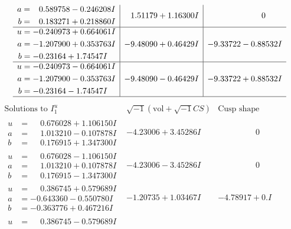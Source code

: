 \documentclass[1p]{elsarticle_modified}
\theoremstyle{definition}
\newcommand{\I}{\sqrt{-1}}
\begin{document}
$$\begin{array}{c|c|c}
\begin{aligned}
a &= \phantom{-}0.589758 - 0.246208 I \\
b &= \phantom{-}0.183271 + 0.218860 I\end{aligned}
 & \phantom{-}1.51179 + 1.16300 I & \phantom{-0.000000 } 0 \\ \hline\begin{aligned}
u &= -0.240973 + 0.664061 I \\
a &= -1.207900 + 0.353763 I \\
b &= -0.23164 + 1.74547 I\end{aligned}
 & -9.48090 + 0.46429 I & -9.33722 - 0.88532 I \\ \hline\begin{aligned}
u &= -0.240973 - 0.664061 I \\
a &= -1.207900 - 0.353763 I \\
b &= -0.23164 - 1.74547 I\end{aligned}
 & -9.48090 - 0.46429 I & -9.33722 + 0.88532 I\\
 \hline 
 \end{array}$$\newpage$$\begin{array}{c|c|c}  
\text{Solutions to }I^u_{1}& \I (\text{vol} + \sqrt{-1}CS) & \text{Cusp shape}\\
 \hline 
\begin{aligned}
u &= \phantom{-}0.676028 + 1.106150 I \\
a &= \phantom{-}1.013210 - 0.107878 I \\
b &= \phantom{-}0.176915 + 1.347300 I\end{aligned}
 & -4.23006 + 3.45286 I & \phantom{-0.000000 } 0 \\ \hline\begin{aligned}
u &= \phantom{-}0.676028 - 1.106150 I \\
a &= \phantom{-}1.013210 + 0.107878 I \\
b &= \phantom{-}0.176915 - 1.347300 I\end{aligned}
 & -4.23006 - 3.45286 I & \phantom{-0.000000 } 0 \\ \hline\begin{aligned}
u &= \phantom{-}0.386745 + 0.579689 I \\
a &= -0.643360 - 0.550780 I \\
b &= -0.363776 + 0.467216 I\end{aligned}
 & -1.20735 + 1.03467 I & -4.78917 + 0. I\phantom{ +0.000000I} \\ \hline\begin{aligned}
u &= \phantom{-}0.386745 - 0.579689 I \\

\end{aligned}
\end{array}$$
\end{document}
